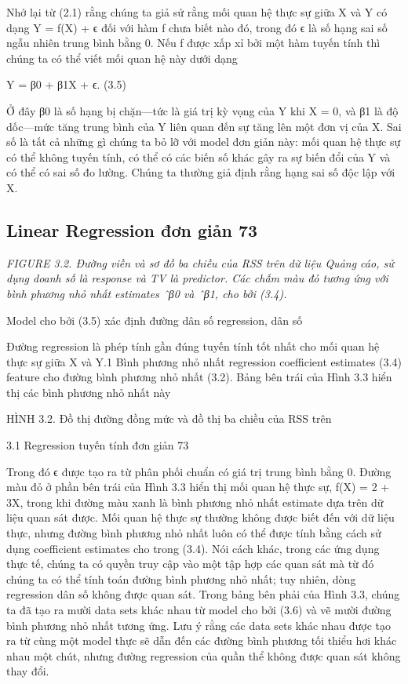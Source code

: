 Nhớ lại từ (2.1) rằng chúng ta giả sử rằng mối quan hệ thực sự giữa X và Y có dạng Y = f(X) + ϵ đối với hàm f chưa biết nào đó, trong đó ϵ là số hạng sai số ngẫu nhiên trung bình bằng 0. Nếu f được xấp xỉ bởi một hàm tuyến tính thì chúng ta có thể viết mối quan hệ này dưới dạng

Y = β0 + β1X + ϵ. (3.5)

Ở đây β0 là số hạng bị chặn—tức là giá trị kỳ vọng của Y khi X = 0, và β1 là độ dốc—mức tăng trung bình của Y liên quan đến sự tăng lên một đơn vị của X. Sai số là tất cả những gì chúng ta bỏ lỡ với model đơn giản này: mối quan hệ thực sự có thể không tuyến tính, có thể có các biến số khác gây ra sự biến đổi của Y và có thể có sai số đo lường. Chúng ta thường giả định rằng hạng sai số độc lập với X.

\subsection{Linear Regression đơn giản 73}

\noindent\textit{FIGURE 3.2. Đường viền và sơ đồ ba chiều của RSS trên dữ liệu Quảng cáo, sử dụng doanh số là response và TV là predictor. Các chấm màu đỏ tương ứng với bình phương nhỏ nhất estimates ˆβ0 và ˆβ1, cho bởi (3.4).}

Model cho bởi (3.5) xác định đường dân số regression, dân số

Đường regression là phép tính gần đúng tuyến tính tốt nhất cho mối quan hệ thực sự giữa X và Y.1 Bình phương nhỏ nhất regression coefficient estimates (3.4) feature cho đường bình phương nhỏ nhất (3.2). Bảng bên trái của Hình 3.3 hiển thị các bình phương nhỏ nhất này

HÌNH 3.2. Đồ thị đường đồng mức và đồ thị ba chiều của RSS trên

3.1 Regression tuyến tính đơn giản 73

Trong đó ϵ được tạo ra từ phân phối chuẩn có giá trị trung bình bằng 0. Đường màu đỏ ở phần bên trái của Hình 3.3 hiển thị mối quan hệ thực sự, f(X) = 2 + 3X, trong khi đường màu xanh là bình phương nhỏ nhất estimate dựa trên dữ liệu quan sát được. Mối quan hệ thực sự thường không được biết đến với dữ liệu thực, nhưng đường bình phương nhỏ nhất luôn có thể được tính bằng cách sử dụng coefficient estimates cho trong (3.4). Nói cách khác, trong các ứng dụng thực tế, chúng ta có quyền truy cập vào một tập hợp các quan sát mà từ đó chúng ta có thể tính toán đường bình phương nhỏ nhất; tuy nhiên, dòng regression dân số không được quan sát. Trong bảng bên phải của Hình 3.3, chúng ta đã tạo ra mười data sets khác nhau từ model cho bởi (3.6) và vẽ mười đường bình phương nhỏ nhất tương ứng. Lưu ý rằng các data sets khác nhau được tạo ra từ cùng một model thực sẽ dẫn đến các đường bình phương tối thiểu hơi khác nhau một chút, nhưng đường regression của quần thể không được quan sát không thay đổi.

